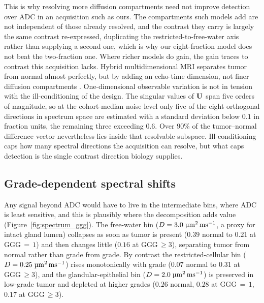This is why resolving more diffusion compartments \citep{panagiotaki2014microstructural, conlin2021improved} need not improve detection over ADC in an acquisition such as ours. The compartments such models add are not independent of those already resolved, and the contrast they carry is largely the same contrast re-expressed, duplicating the restricted-to-free-water axis rather than supplying a second one, which is why our eight-fraction model does not beat the two-fraction one. Where richer models do gain, the gain traces to contrast this acquisition lacks. Hybrid multidimensional MRI separates tumor from normal almost perfectly, but by adding an echo-time dimension, not finer diffusion compartments \citep{chatterjee2018hybrid}.
One-dimensional observable variation is not in tension with the ill-conditioning of the design. The singular values of $\mathbf{U}$ span five orders of magnitude, so at the cohort-median noise level only five of the eight orthogonal directions in spectrum space are estimated with a standard deviation below $0.1$ in fraction units, the remaining three exceeding $0.6$. Over $90\%$ of the tumor--normal difference vector nevertheless lies inside that resolvable subspace. Ill-conditioning caps how many spectral directions the acquisition can resolve, but what caps detection is the single contrast direction biology supplies.

\subsection{Grade-dependent spectral shifts}
Any signal beyond ADC would have to live in the intermediate bins, where ADC is least sensitive, and this is plausibly where the decomposition adds value (Figure~\ref{fig:spectrum_ggg}).
The free-water bin ($D = 3.0\;\si{\micro\meter\squared\per\milli\second}$, a proxy for intact gland lumen) collapses as soon as tumor is present ($0.39$ normal to $0.21$ at GGG\,$=\,1$) and then changes little ($0.16$ at GGG\,$\geq 3$), separating tumor from normal rather than grade from grade.
By contrast the restricted-cellular bin ($D = 0.25\;\si{\micro\meter\squared\per\milli\second}$) rises monotonically with grade ($0.07$ normal to $0.31$ at GGG\,$\geq 3$), and the glandular-epithelial bin ($D = 2.0\;\si{\micro\meter\squared\per\milli\second}$) is preserved in low-grade tumor and depleted at higher grades ($0.26$ normal, $0.28$ at GGG\,$=\,1$, $0.17$ at GGG\,$\geq 3$).

